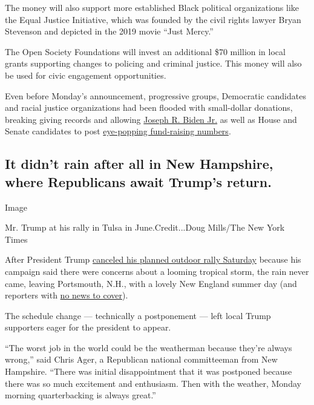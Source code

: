 The money will also support more established Black political
organizations like the Equal Justice Initiative, which was founded by
the civil rights lawyer Bryan Stevenson and depicted in the 2019 movie
``Just Mercy.''

The Open Society Foundations will invest an additional \$70 million in
local grants supporting changes to policing and criminal justice. This
money will also be used for civic engagement opportunities.

Even before Monday's announcement, progressive groups, Democratic
candidates and racial justice organizations had been flooded with
small-dollar donations, breaking giving records and allowing
\href{https://www.nytimes.com/interactive/2020/us/elections/joe-biden.html}{Joseph
R. Biden Jr.} as well as House and Senate candidates to post
\href{https://www.nytimes.com/2020/07/01/us/politics/trump-fundraising-2020.html}{eye-popping
fund-raising numbers}.

\hypertarget{it-didnt-rain-after-all-in-new-hampshire-where-republicans-await-trumps-return}{%
\subsection{It didn't rain after all in New Hampshire, where Republicans
await Trump's
return.}\label{it-didnt-rain-after-all-in-new-hampshire-where-republicans-await-trumps-return}}

Image

Mr. Trump at his rally in Tulsa in June.Credit...Doug Mills/The New York
Times

After President Trump
\href{https://www.nytimes.com/2020/07/10/us/politics/trump-nh-rally-postponed.html}{canceled
his planned outdoor rally Saturday} because his campaign said there were
concerns about a looming tropical storm, the rain never came, leaving
Portsmouth, N.H., with a lovely New England summer day (and reporters
with
\href{https://twitter.com/DJJudd/status/1281660158951788545?s=20}{no
news to cover}).

The schedule change --- technically a postponement --- left local Trump
supporters eager for the president to appear.

``The worst job in the world could be the weatherman because they're
always wrong,'' said Chris Ager, a Republican national committeeman from
New Hampshire. ``There was initial disappointment that it was postponed
because there was so much excitement and enthusiasm. Then with the
weather, Monday morning quarterbacking is always great.''

